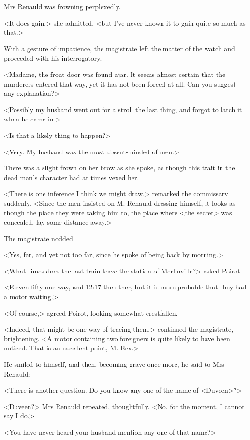  Mrs Renauld was frowning perplexedly. 

 <It does gain,> she admitted, <but I've never known it to gain quite so much as that.> 

 With a gesture of impatience, the magistrate left the matter of the watch and proceeded with his interrogatory. 

 <Madame, the front door was found ajar. It seems almost certain that the murderers entered that way, yet it has not been forced at all. Can you suggest any explanation?> 

 <Possibly my husband went out for a stroll the last thing, and forgot to latch it when he came in.> 

 <Is that a likely thing to happen?> 

 <Very. My husband was the most absent-minded of men.> 

 There was a slight frown on her brow as she spoke, as though this trait in the dead man's character had at times vexed her. 

 <There is one inference I think we might draw,> remarked the commissary suddenly. <Since the men insisted on M. Renauld dressing himself, it looks as though the place they were taking him to, the place where <the secret> was concealed, lay some distance away.> 

 The magistrate nodded. 

 <Yes, far, and yet not too far, since he spoke of being back by morning.> 

 <What times does the last train leave the station of Merlinville?> asked Poirot. 

 <Eleven-fifty one way, and 12:17 the other, but it is more probable that they had a motor waiting.> 

 <Of course,> agreed Poirot, looking somewhat crestfallen. 

 <Indeed, that might be one way of tracing them,> continued the magistrate, brightening. <A motor containing two foreigners is quite likely to have been noticed. That is an excellent point, M. Bex.> 

 He smiled to himself, and then, becoming grave once more, he said to Mrs Renauld: 

 <There is another question. Do you know any one of the name of <Duveen>?> 

 <Duveen?> Mrs Renauld repeated, thoughtfully. <No, for the moment, I cannot say I do.> 

 <You have never heard your husband mention any one of that name?> 

